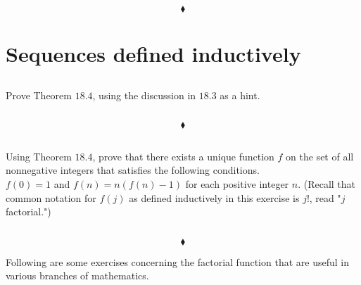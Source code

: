 $$\blacklozenge$$

\newpage

 \section{Sequences defined inductively}
\subsection{}
\begin{tcolorbox}
Prove Theorem $\mathbf{18.4}$, using the discussion in $\mathbf{18.3}$ as a hint. 
\end{tcolorbox}
$$ $$

$$\blacklozenge$$
\subsection{}
\begin{tcolorbox}
Using Theorem $\mathbf{18.4}$, prove that there exists a unique function $f$ on the set of all nonnegative integers that satisfies the following conditions. \\
$f(0) = 1 $ and $ f(n) =n(f(n)- 1)$ for each positive integer $n$. (Recall that common notation for $f(j)$ as defined inductively in this exercise is $j!$, read "$j$ factorial.")  
\end{tcolorbox}
$$ $$

$$\blacklozenge$$

Following are some exercises concerning the factorial function that are useful in various branches of mathematics.\\

